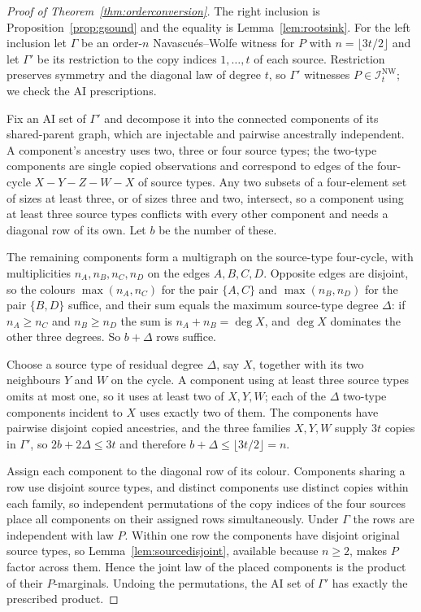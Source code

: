 \documentclass[11pt]{article}
\theoremstyle{plain}
\theoremstyle{definition}
\newcommand{\INW}{\mathcal I^{\mathrm{NW}}}
\begin{document}
\begin{proof}[Proof of Theorem~\ref{thm:orderconversion}]
The right inclusion is Proposition~\ref{prop:gsound} and the equality is Lemma~\ref{lem:rootsink}. For the left inclusion let $\Gamma$ be an order-$n$ Navascu\'es--Wolfe witness for $P$ with $n=\lfloor3t/2\rfloor$ and let $\Gamma'$ be its restriction to the copy indices $1,\dots,t$ of each source. Restriction preserves symmetry and the diagonal law of degree $t$, so $\Gamma'$ witnesses $P\in\INW_t$; we check the AI prescriptions.

Fix an AI set of $\Gamma'$ and decompose it into the connected components of its shared-parent graph, which are injectable and pairwise ancestrally independent. A component's ancestry uses two, three or four source types; the two-type components are single copied observations and correspond to edges of the four-cycle $X-Y-Z-W-X$ of source types. Any two subsets of a four-element set of sizes at least three, or of sizes three and two, intersect, so a component using at least three source types conflicts with every other component and needs a diagonal row of its own. Let $b$ be the number of these.

The remaining components form a multigraph on the source-type four-cycle, with multiplicities $n_A,n_B,n_C,n_D$ on the edges $A,B,C,D$. Opposite edges are disjoint, so the colours $\max(n_A,n_C)$ for the pair $\{A,C\}$ and $\max(n_B,n_D)$ for the pair $\{B,D\}$ suffice, and their sum equals the maximum source-type degree $\Delta$: if $n_A\ge n_C$ and $n_B\ge n_D$ the sum is $n_A+n_B=\deg X$, and $\deg X$ dominates the other three degrees. So $b+\Delta$ rows suffice.

Choose a source type of residual degree $\Delta$, say $X$, together with its two neighbours $Y$ and $W$ on the cycle. A component using at least three source types omits at most one, so it uses at least two of $X,Y,W$; each of the $\Delta$ two-type components incident to $X$ uses exactly two of them. The components have pairwise disjoint copied ancestries, and the three families $X,Y,W$ supply $3t$ copies in $\Gamma'$, so $2b+2\Delta\le3t$ and therefore $b+\Delta\le\lfloor3t/2\rfloor=n$.

Assign each component to the diagonal row of its colour. Components sharing a row use disjoint source types, and distinct components use distinct copies within each family, so independent permutations of the copy indices of the four sources place all components on their assigned rows simultaneously. Under $\Gamma$ the rows are independent with law $P$. Within one row the components have disjoint original source types, so Lemma~\ref{lem:sourcedisjoint}, available because $n\ge2$, makes $P$ factor across them. Hence the joint law of the placed components is the product of their $P$-marginals. Undoing the permutations, the AI set of $\Gamma'$ has exactly the prescribed product.
\end{proof}
\end{document}
